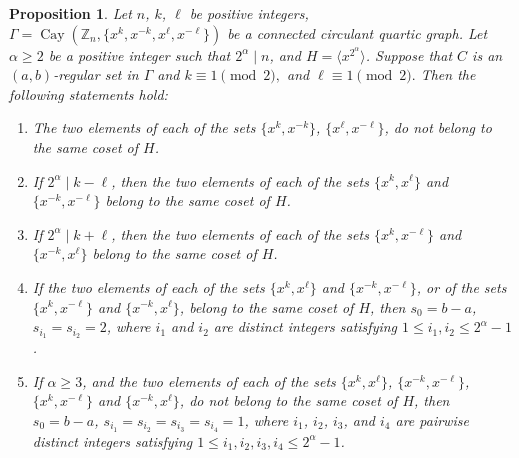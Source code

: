 \documentclass[12pt]{article}
\newtheorem{prop}[formula]{Proposition}
\begin{document}
   \begin{prop}\label{prop:even2}
 	Let $n$, $k$, $\ell$ be positive integers,
 	$
 	\Gamma=\operatorname{Cay}(\mathbb{Z}_n,\{x^k,x^{-k},x^\ell,x^{-\ell}\})
 	$
 	be a connected circulant quartic graph. Let $\alpha\ge2$ be a positive integer such that $2^\alpha\mid n$, and
 	$H=\langle x^{2^\alpha}\rangle$.
 	Suppose that $C$ is an $(a,b)$-regular set in $\Gamma$ and
 	$
 	k\equiv1\pmod 2,$ and
 	$\ell\equiv1\pmod 2.
 	$
 	Then the following statements hold:
 	\begin{enumerate}
 		\item[(i)] The two elements of each of the sets $\{x^k,x^{-k}\}$, $\{x^\ell,x^{-\ell}\}$, do not belong to the same coset of $H$.
 		\item[(ii)] If $2^\alpha \mid k-\ell$, then the two elements of each of the sets $\{x^k,x^\ell\}$ and $\{x^{-k},x^{-\ell}\}$ belong to the same coset of $H$.
 		\item[(iii)] If $2^\alpha \mid k+\ell$, then the two elements of each of the sets $\{x^k,x^{-\ell}\}$ and $\{x^{-k},x^{\ell}\}$ belong to the same coset of $H$.
 		\item[(iv)] If the two elements of each of the sets $\{x^k,x^\ell\}$ and $\{x^{-k},x^{-\ell}\}$, or of the sets $\{x^k,x^{-\ell}\}$ and $\{x^{-k},x^\ell\}$, belong to the same coset of $H$, then $s_0=b-a$, $s_{i_1}=s_{i_2}=2$, where $i_1$ and $i_2$ are distinct integers satisfying $1\le i_1,i_2\le 2^\alpha-1$.
 		\item[(v)] If $\alpha\geq 3$, and the two elements of each of the sets $\{x^k,x^\ell\}$, $\{x^{-k},x^{-\ell}\}$, $\{x^k,x^{-\ell}\}$ and $\{x^{-k},x^\ell\}$, do not belong to the same coset of $H$, then $s_0=b-a$, $s_{i_1}=s_{i_2}=s_{i_3}=s_{i_4}=1$, where $i_1$, $i_2$, $i_3$, and $i_4$ are pairwise distinct integers satisfying $1\le i_1,i_2,i_3,i_4\le 2^\alpha-1$.
 	\end{enumerate}
 \end{prop}
\end{document}
